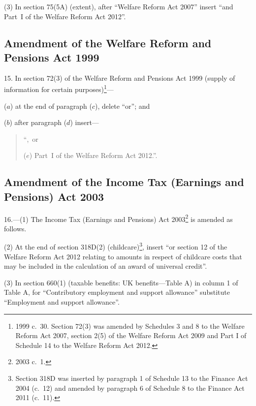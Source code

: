 \documentclass[12pt,a4paper]{article}
\begin{document}
(3) In section 75(5A) (extent), after “Welfare Reform Act 2007” insert “and Part~I of the Welfare Reform Act 2012”.

\subsection[15. Amendment of the Welfare Reform and Pensions Act 1999]{Amendment of the Welfare Reform and Pensions Act 1999}

15.  In section 72(3) of the Welfare Reform and Pensions Act 1999 (supply of information for certain purposes)\footnote{1999 c.~30. Section 72(3) was amended by Schedules 3 and 8 to the Welfare Reform Act 2007, section 2(5) of the Welfare Reform Act 2009 and Part I of Schedule 14 to the Welfare Reform Act 2012.}—

($a$) at the end of paragraph ($c$), delete “or”; and

($b$) after paragraph ($d$)  insert—
\begin{quotation}
“,~or

($e$) Part~I of the Welfare Reform Act 2012.”.
\end{quotation}

\subsection[16. Amendment of the Income Tax (Earnings and Pensions) Act 2003]{Amendment of the Income Tax (Earnings and Pensions) Act 2003}

16.—(1) The Income Tax (Earnings and Pensions) Act 2003\footnote{2003 c.~1.} is amended as follows.

(2) At the end of section 318D(2) (childcare)\footnote{Section 318D was inserted by paragraph 1 of Schedule 13 to the Finance Act 2004 (c.~12) and amended by paragraph 6 of Schedule 8 to the Finance Act 2011 (c.~11).}, insert “or section 12 of the Welfare Reform Act 2012 relating to amounts in respect of childcare costs that may be included in the calculation of an award of universal credit”.

(3) In section 660(1) (taxable benefits: UK benefits---Table A) in column 1 of Table A, for “Contributory employment and support allowance” substitute “Employment and support allowance”.
\end{document}
